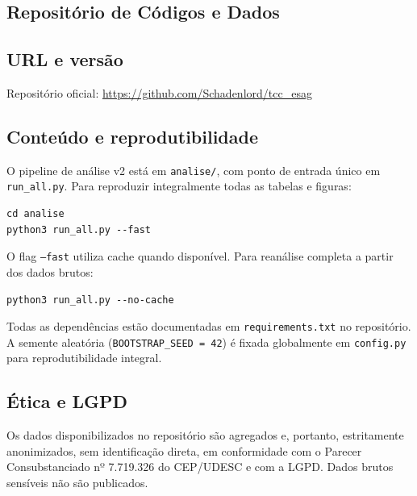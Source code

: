 \begin{apendicesenv}
\chapter{Repositório de Códigos e Dados}
\label{ap:repo}

\section*{URL e versão}
Repositório oficial: \url{https://github.com/Schadenlord/tcc_esag}

\section*{Conteúdo e reprodutibilidade}
O pipeline de análise v2 está em \texttt{analise/}, com ponto de entrada único em \texttt{run\_all.py}. Para reproduzir integralmente todas as tabelas e figuras:

\begin{verbatim}
cd analise
python3 run_all.py --fast
\end{verbatim}

O flag \texttt{--fast} utiliza cache quando disponível. Para reanálise completa a partir dos dados brutos:

\begin{verbatim}
python3 run_all.py --no-cache
\end{verbatim}

Todas as dependências estão documentadas em \texttt{requirements.txt} no repositório. A semente aleatória (\texttt{BOOTSTRAP\_SEED = 42}) é fixada globalmente em \texttt{config.py} para reprodutibilidade integral.

\section*{Ética e LGPD}
Os dados disponibilizados no repositório são agregados e, portanto, estritamente anonimizados, sem identificação direta, em conformidade com o Parecer Consubstanciado nº 7.719.326 do CEP/UDESC e com a LGPD. Dados brutos sensíveis não são publicados.

\end{apendicesenv}
